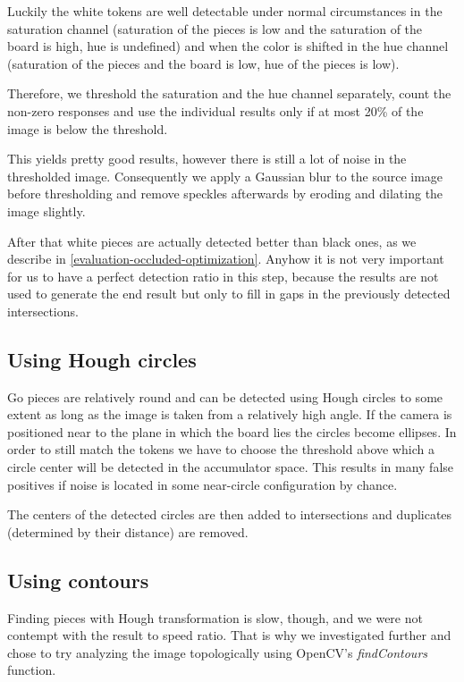 	Luckily the white tokens are well detectable under normal circumstances in the saturation channel (saturation of the pieces is low and the saturation of the board is high, hue is undefined) and when the color is shifted in the hue channel (saturation of the pieces and the board is low, hue of the pieces is low).

	Therefore, we threshold the saturation and the hue channel separately, count the non-zero responses and use the individual results only if at most 20\% of the image is below the threshold.

	This yields pretty good results, however there is still a lot of noise in the thresholded image. Consequently we apply a Gaussian blur to the source image before thresholding and remove speckles afterwards by eroding and dilating the image slightly.

	After that white pieces are actually detected better than black ones, as we describe in \ref{evaluation-occluded-optimization}. Anyhow it is not very important for us to have a perfect detection ratio in this step, because the results are not used to generate the end result but only to fill in gaps in the previously detected intersections.

	\subsection{Using Hough circles}
	\label{detector-occluded-hough}
	Go pieces are relatively round and can be detected using Hough circles to some extent as long as the image is taken from a relatively high angle. If the camera is positioned near to the plane in which the board lies the circles become ellipses. In order to still match the tokens we have to choose the threshold above which a circle center will be detected in the accumulator space. This results in many false positives if noise is located in some near-circle configuration by chance.

	The centers of the detected circles are then added to intersections and duplicates (determined by their distance) are removed.

	\subsection{Using contours}
	\label{detector-occluded-contours}
	Finding pieces with Hough transformation is slow, though, and we were not contempt with the result to speed ratio. That is why we investigated further and chose to try analyzing the image topologically \cite{suzuki1985topological} using OpenCV's \emph{findContours} function.

